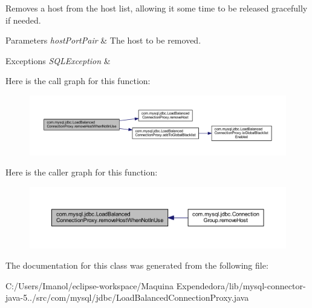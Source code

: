 Removes a host from the host list, allowing it some time to be released gracefully if needed.


\begin{DoxyParams}{Parameters}
{\em host\+Port\+Pair} & The host to be removed. \\
\hline
\end{DoxyParams}

\begin{DoxyExceptions}{Exceptions}
{\em S\+Q\+L\+Exception} & \\
\hline
\end{DoxyExceptions}
Here is the call graph for this function\+:
\nopagebreak
\begin{figure}[H]
\begin{center}
\leavevmode
\includegraphics[width=350pt]{classcom_1_1mysql_1_1jdbc_1_1_load_balanced_connection_proxy_af3322f74308fe5ca51f73f36f99aa12f_cgraph}
\end{center}
\end{figure}
Here is the caller graph for this function\+:
\nopagebreak
\begin{figure}[H]
\begin{center}
\leavevmode
\includegraphics[width=350pt]{classcom_1_1mysql_1_1jdbc_1_1_load_balanced_connection_proxy_af3322f74308fe5ca51f73f36f99aa12f_icgraph}
\end{center}
\end{figure}


The documentation for this class was generated from the following file\+:\begin{DoxyCompactItemize}
\item 
C\+:/\+Users/\+Imanol/eclipse-\/workspace/\+Maquina Expendedora/lib/mysql-\/connector-\/java-\/5../src/com/mysql/jdbc/Load\+Balanced\+Connection\+Proxy.\+java\end{DoxyCompactItemize}
